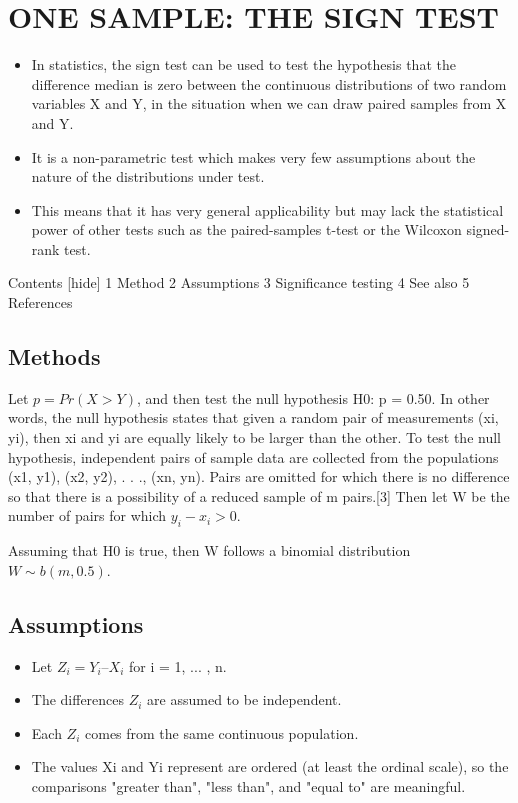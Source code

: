 \section{ONE SAMPLE: THE SIGN TEST}
\begin{itemize}
\item In statistics, the sign test can be used to test the hypothesis that the difference median is zero between the continuous distributions of two random variables X and Y, in the situation when we can draw paired samples from X and Y. 
\item It is a non-parametric test which makes very few assumptions about the nature of the distributions under test. 
\item This means that it has very general applicability but may lack the statistical power of other tests such as the paired-samples t-test or the Wilcoxon signed-rank test.
\end{itemize}

Contents  [hide] 
1 Method
2 Assumptions
3 Significance testing
4 See also
5 References

\subsection*{Methods}
Let $p = Pr(X > Y)$, and then test the null hypothesis H0: p = 0.50. In other words, the null hypothesis states that given a random pair of measurements (xi, yi), then xi and yi are equally likely to be larger than the other.
To test the null hypothesis, independent pairs of sample data are collected from the populations {(x1, y1), (x2, y2), . . ., (xn, yn)}. Pairs are omitted for which there is no difference so that there is a possibility of a reduced sample of m pairs.[3]
Then let W be the number of pairs for which $y_i − x_i > 0$. 

Assuming that H0 is true, then W follows a binomial distribution $W \sim b(m, 0.5)$.
\subsection*{Assumptions}
\begin{itemize}
\item Let $Z_i = Y_i – X_i$ for i = 1, ... , n.
\item The differences $Z_i$ are assumed to be independent.
\item Each $Z_i$ comes from the same continuous population.
\item The values Xi and Yi represent are ordered (at least the ordinal scale), so the comparisons "greater than", "less than", and "equal to" are meaningful.
\end{itemize}

